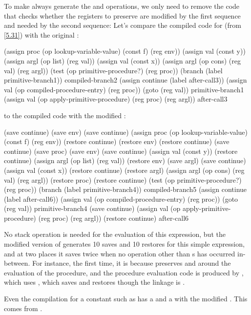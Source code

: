 \begin{exe}[5.37]
    To make  always generate the  and  
    operations, we only need to remove the code that checks whether the 
    registers to preserve are modified by the first sequence and needed by the 
    second sequence:
    Let’s compare the compiled code for  (from \autoref{5.31}) 
    with the original :
    \begin{cscm}
	    (assign proc (op lookup-variable-value) (const f) (reg env))
	    (assign val (const y))
	    (assign argl (op list) (reg val))
	    (assign val (const x))
	    (assign argl (op cons) (reg val) (reg argl))
	    (test (op primitive-procedure?) (reg proc))
	    (branch (label primitive-branch1))
	compiled-branch2
	    (assign continue (label after-call3))
	    (assign val (op compiled-procedure-entry) (reg proc))
	    (goto (reg val))
	primitive-branch1
	    (assign val (op apply-primitive-procedure) (reg proc) (reg argl))
	after-call3
    \end{cscm}
    to the compiled code with the modified :
    \begin{cscm}
	    (save continue)
	    (save env)
	    (save continue)
	    (assign proc (op lookup-variable-value) (const f) (reg env))
	    (restore continue)
	    (restore env)
	    (restore continue)
	    (save continue)
	    (save proc)
	    (save env)
	    (save continue)
	    (assign val (const y))
	    (restore continue)
	    (assign argl (op list) (reg val))
	    (restore env)
	    (save argl)
	    (save continue)
	    (assign val (const x))
	    (restore continue)
	    (restore argl)
	    (assign argl (op cons) (reg val) (reg argl))
	    (restore proc)
	    (restore continue)
	    (test (op primitive-procedure?) (reg proc))
	    (branch (label primitive-branch4))
	compiled-branch5
	    (assign continue (label after-call6))
	    (assign val (op compiled-procedure-entry) (reg proc))
	    (goto (reg val))
	primitive-branch4
	    (save continue)
	    (assign val (op apply-primitive-procedure) (reg proc) (reg argl))
	    (restore continue)
	after-call6
    \end{cscm}
    No stack operation is needed for the evaluation of this expression, but the 
    modified version of  generates 10 saves and 10 restores for 
    this simple expression, and at two places it saves  twice 
    when no operation other than s has occurred in-between.
    For instance, the first time, it is because  
    preserves  and  around the evaluation of the 
    procedure, and the procedure evaluation code is produced by 
    , which uses , which saves and 
    restores  though the linkage is .

    Even the compilation for a constant such as  has a  and 
    a  with the modified . This comes from 
    .
\end{exe}

